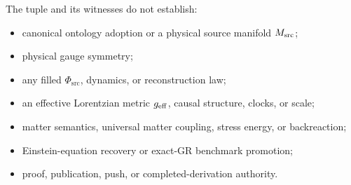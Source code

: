 \documentclass[11pt]{article}
\newcommand{\PhiSrc}{\Phi_{\mathrm{src}}}
\begin{document}
The tuple and its witnesses do not establish:
\begin{itemize}
  \item canonical ontology adoption or a physical source manifold \(M_{\rm src}\);
  \item physical gauge symmetry;
  \item any filled \(\PhiSrc\), dynamics, or reconstruction law;
  \item an effective Lorentzian metric \(g_{\rm eff}\), causal structure,
  clocks, or scale;
  \item matter semantics, universal matter coupling, stress energy, or
  backreaction;
  \item Einstein-equation recovery or exact-GR benchmark promotion;
  \item proof, publication, push, or completed-derivation authority.
\end{itemize}
\end{document}
